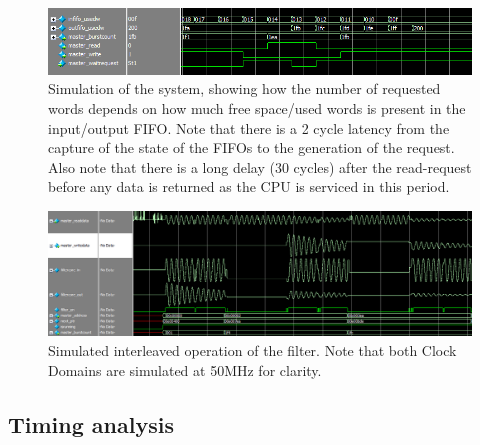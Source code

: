 \documentclass[]{article}
\begin{document}
\begin{figure}[p]
	\begin{center}
		\includegraphics[width = \textwidth]{usedwords_burstcount.PNG}
	\end{center}
	\caption{Simulation of the system, showing how the number of requested words depends on how much free space/used words is present in the input/output FIFO. Note that there is a 2 cycle latency from the capture of the state of the FIFOs to the generation of the request. Also note that there is a long delay (30 cycles) after the read-request before any data is returned as the CPU is serviced in this period.}
	\label{fig:usedwords_burstcount}
\end{figure}

\begin{figure}[p]
	\begin{center}
		\includegraphics[width = \textwidth]{notchfilter_read_and_write_cropped.png}
	\end{center}
	\caption{Simulated interleaved operation of the filter. Note that both Clock Domains are simulated at 50MHz for clarity.}
	\label{fig:interleaved_sim}
\end{figure}


\clearpage

\subsection{Timing analysis} %
\label{sub:timing_analysis}
\end{document}
